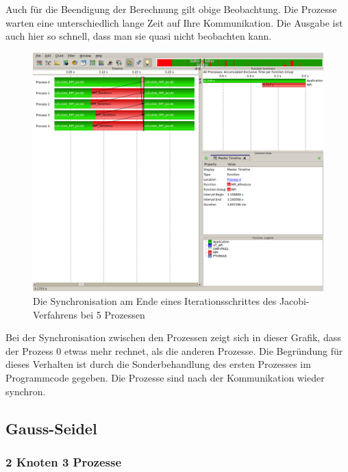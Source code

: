 \documentclass[a4paper,12pt]{scrartcl}
\begin{document}
Auch für die Beendigung der Berechnung gilt obige Beobachtung. Die Prozesse warten eine unterschiedlich lange Zeit auf Ihre Kommunikation. Die Ausgabe ist auch hier so schnell, dass man sie quasi nicht beobachten kann. 
\FloatBarrier
\begin{figure}[hr!]
 \includegraphics[scale=0.45]{./5_4_JA/Syncronize.png}
 \caption{Die Synchronisation am Ende eines Iterationsschrittes des Jacobi-Verfahrens bei 5 Prozessen}
\end{figure}
Bei der Synchronisation zwischen den Prozessen zeigt sich in dieser Grafik, dass der Prozess 0 etwas mehr rechnet, als die anderen Prozesse. Die Begründung für dieses Verhalten ist durch die Sonderbehandlung des ersten Prozesses im Programmcode gegeben. Die Prozesse sind nach der Kommunikation wieder synchron.
\newpage
\FloatBarrier
\FloatBarrier
\subsection{Gauss-Seidel}
\subsubsection{2 Knoten 3 Prozesse}
\end{document}
